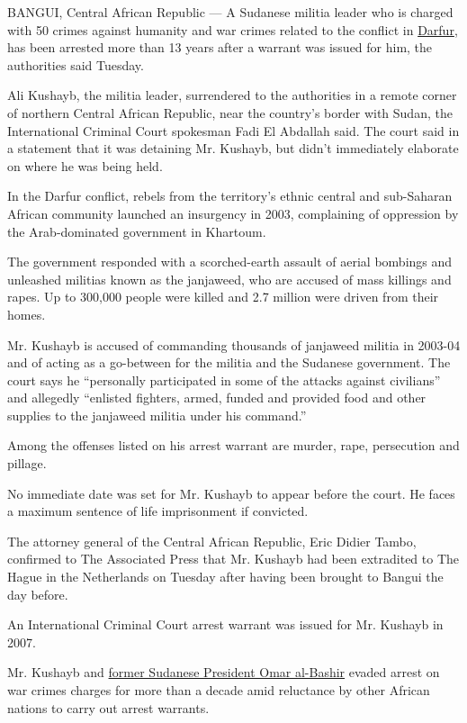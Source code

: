 BANGUI, Central African Republic --- A Sudanese militia leader who is
charged with 50 crimes against humanity and war crimes related to the
conflict in
\href{https://www.nytimes3xbfgragh.onion/2020/07/30/world/middleeast/darfur-sudan.html}{Darfur},
has been arrested more than 13 years after a warrant was issued for him,
the authorities said Tuesday.

Ali Kushayb, the militia leader, surrendered to the authorities in a
remote corner of northern Central African Republic, near the country's
border with Sudan, the International Criminal Court spokesman Fadi El
Abdallah said. The court said in a statement that it was detaining Mr.
Kushayb, but didn't immediately elaborate on where he was being held.

In the Darfur conflict, rebels from the territory's ethnic central and
sub-Saharan African community launched an insurgency in 2003,
complaining of oppression by the Arab-dominated government in Khartoum.

The government responded with a scorched-earth assault of aerial
bombings and unleashed militias known as the janjaweed, who are accused
of mass killings and rapes. Up to 300,000 people were killed and 2.7
million were driven from their homes.

Mr. Kushayb is accused of commanding thousands of janjaweed militia in
2003-04 and of acting as a go-between for the militia and the Sudanese
government. The court says he ``personally participated in some of the
attacks against civilians'' and allegedly ``enlisted fighters, armed,
funded and provided food and other supplies to the janjaweed militia
under his command.''

Among the offenses listed on his arrest warrant are murder, rape,
persecution and pillage.

No immediate date was set for Mr. Kushayb to appear before the court. He
faces a maximum sentence of life imprisonment if convicted.

The attorney general of the Central African Republic, Eric Didier Tambo,
confirmed to The Associated Press that Mr. Kushayb had been extradited
to The Hague in the Netherlands on Tuesday after having been brought to
Bangui the day before.

An International Criminal Court arrest warrant was issued for Mr.
Kushayb in 2007.

Mr. Kushayb and
\href{https://www.nytimes3xbfgragh.onion/2020/07/30/world/middleeast/darfur-sudan.html}{former
Sudanese President Omar al-Bashir} evaded arrest on war crimes charges
for more than a decade amid reluctance by other African nations to carry
out arrest warrants.

